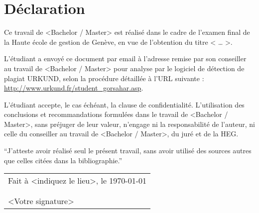 
\newpage

\section*{Déclaration}		%

Ce travail de <Bachelor / Master> est réalisé dans le cadre de l’examen final de la Haute école de gestion de Genève, en vue de l’obtention du titre < … >.

L’étudiant a envoyé ce document par email à l'adresse remise par son conseiller au travail de <Bachelor / Master> pour analyse par le logiciel de détection de plagiat URKUND, selon la procédure détaillée à l’URL suivante : \url{http://www.urkund.fr/student_gorsahar.asp}.

L’étudiant accepte, le cas échéant, la clause de confidentialité. L'utilisation des conclusions et recommandations formulées dans le travail de <Bachelor / Master>, sans préjuger de leur valeur, n'engage ni la responsabilité de l'auteur, ni celle du conseiller au travail de <Bachelor / Master>, du juré et de la HEG. \bigskip{}


\enquote{J’atteste avoir réalisé seul le présent travail, sans avoir utilisé
des sources autres que celles citées dans la bibliographie.} \vspace{3cm}


\noindent \begin{flushright}
\begin{tabular}{l}
	\makeatletter		%
		Fait à <indiquez le lieu>, le \today{}\tabularnewline
		\@author\tabularnewline
		\tabularnewline
		<Votre signature>		%
	\makeatother
\end{tabular}
\par\end{flushright}

\pagestyle{fancy}

